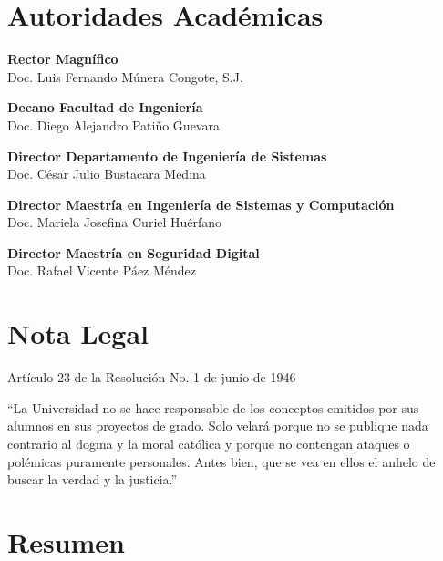 \documentclass[12pt,letterpaper,fleqn]{report}
\begin{document}
\chapter*{Autoridades Académicas}

\textbf{Rector Magnífico}\\
Doc. Luis Fernando Múnera Congote, S.J.

\vspace{0.5cm}

\textbf{Decano Facultad de Ingeniería}\\
Doc. Diego Alejandro Patiño Guevara

\vspace{0.5cm}

\textbf{Director Departamento de Ingeniería de Sistemas}\\
Doc. César Julio Bustacara Medina

\vspace{0.5cm}

\textbf{Director Maestría en Ingeniería de Sistemas y Computación}\\
Doc. Mariela Josefina Curiel Huérfano

\vspace{0.5cm}

\textbf{Director Maestría en Seguridad Digital}\\
Doc. Rafael Vicente Páez Méndez

\chapter*{Nota Legal}

Artículo 23 de la Resolución No. 1 de junio de 1946

``La Universidad no se hace responsable de los conceptos emitidos por sus alumnos en sus proyectos de grado. Solo velará porque no se publique nada contrario al dogma y la moral católica y porque no contengan ataques o polémicas puramente personales. Antes bien, que se vea en ellos el anhelo de buscar la verdad y la justicia.''

\chapter*{Resumen}
\end{document}
